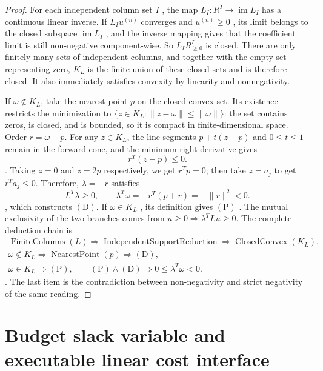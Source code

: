 \documentclass[12pt,a4paper,openany,notitlepage]{report}
\theoremstyle{plain}
\theoremstyle{definition}
\theoremstyle{remark}
\def\mathcal#1{#1}\def\mathsf#1{#1}\def\mathbb#1{#1}%
\begin{document}
\begin{CJK*}
\begin{proof}
For each independent column set $I$ , the map $L_I:\mathbb R^{I}\to\operatorname{im}L_I$ has a continuous linear inverse. If $L_Iu^{(n)}$ converges and $u^{(n)}\ge0$ , its limit belongs to the closed subspace $\operatorname{im}L_I$ , and the inverse mapping gives that the coefficient limit is still non-negative component-wise. So $L_I\mathbb R_{\ge0}^{I}$ is closed. There are only finitely many sets of independent columns, and together with the empty set representing zero, $\mathcal K_L$ is the finite union of these closed sets and is therefore closed. It also immediately satisfies convexity by linearity and nonnegativity.

If $\omega\notin\mathcal K_L$, take the nearest point $p$ on the closed convex set. Its existence restricts the minimization to $\{z\in\mathcal K_L:\|z-\omega\|\le\|\omega\|\}$: the set contains zeros, is closed, and is bounded, so it is compact in finite-dimensional space. Order $r=\omega-p$. For any $z\in\mathcal K_L$, the line segments $p+t(z-p)$ and $0\le t\le1$ remain in the forward cone, and the minimum right derivative gives \[
 r^{\mathsf T}(z-p)\le0.
\]. Taking $z=0$ and $z=2p$ respectively, we get $r^{\mathsf T}p=0$; then take $z=a_j$ to get $r^{\mathsf T}a_j\le0$. Therefore, $\lambda=-r$ satisfies \[
 L^{\mathsf T}\lambda\ge0,\qquad
 \lambda^{\mathsf T}\omega
 =-r^{\mathsf T}(p+r)=-\|r\|^2<0.
\], which constructs $\mathrm{(D)}$. If $\omega\in\mathcal K_L$ , its definition gives $\mathrm{(P)}$ . The mutual exclusivity of the two branches comes from $u\ge0\Rightarrow\lambda^{\mathsf T}Lu\ge0$. The complete deduction chain is \[
 \begin{gathered}
 \operatorname{FiniteColumns}(L)
 \Rightarrow\operatorname{IndependentSupportReduction}
 \Rightarrow\operatorname{ClosedConvex}(\mathcal K_L),\\
 \omega\notin\mathcal K_L
 \Rightarrow\operatorname{NearestPoint}(p)
 \Rightarrow\mathrm{(D)},\\
 \omega\in\mathcal K_L\Rightarrow\mathrm{(P)},\qquad
 \mathrm{(P)}\land\mathrm{(D)}\Rightarrow 0\le\lambda^{\mathsf T}\omega<0.
 \end{gathered}
\]. The last item is the contradiction between non-negativity and strict negativity of the same reading.\end{proof}


\section { Budget slack variable and executable linear cost interface }\label{exp:hom:budget-cone}



\end{CJK*}
\end{document}
